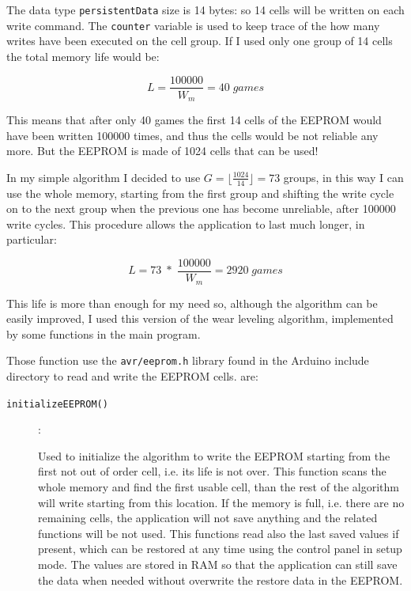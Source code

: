 \documentclass[11pt,english]{article}
\newcommand{\code}[1]{\texttt{#1}}
\begin{document}
The data type \code{persistentData} size is 14 bytes: so 14 cells will be written on each write command. The 
\code{counter} variable is used to keep trace of the how many writes have been executed on the cell group. If 
I used only one group of 14 cells the total memory life would be:

\[
L = \frac{100000}{W_m} = 40 \; games
\] 

This means that after only 40 games the first 14 cells of the EEPROM would have been written 100000 times, and thus 
the cells would be not reliable any more. But the EEPROM is made of 1024 cells that can be used! 

In my simple algorithm I decided to use $G = \lfloor\tfrac{1024}{14}\rfloor = 73$ groups, in this way I can use 
the whole memory, starting from the first group and shifting the write cycle on to the next group when the previous 
one has become unreliable, after 100000 write cycles. 
This procedure allows the application to last much longer, in particular:

\[
L = 73 \; * \; \frac{100000}{W_m} = 2920 \; games
\]

This life is more than enough for my need so, although the algorithm can be easily improved, I used this version of 
the wear leveling algorithm, implemented by some functions in the main program.

Those function use the \code{avr/eeprom.h} library found in the Arduino include directory to read and write the EEPROM 
cells. are:

\begin{description}
\item[\code{initializeEEPROM()}]:

Used to initialize the algorithm to write the EEPROM starting from the first not 
out of order cell, i.e. its life is not over. This function scans the whole memory and find the first usable cell,
than the rest of the algorithm will write starting from this location. If the memory is full, i.e. there are no 
remaining cells, the application will not save anything and the related functions will be not used.
This functions read also the last saved values if present, which can be restored at any time using the control 
panel in setup mode. The values are stored in RAM so that the application can still save the data when needed 
without overwrite the restore data in the EEPROM.
\end{description}
\end{document}
